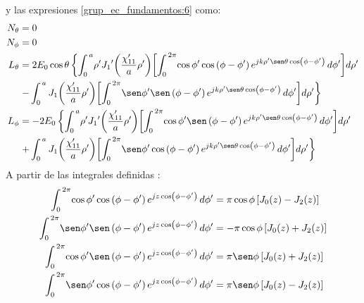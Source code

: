 y las expresiones \eqref{grup_ec_fundamentos:6} como:
\begin{subequations}
\label{grup_ec_apC:8}
\begin{align}
N_{\theta} &= 0
\label{ec_apC:35}\\
N_{\phi} &= 0
\label{ec_apC:36}\\
L_{\theta}  &= 2E_0\cos\theta\left\{\int_{0}^{\,a}\!\rho '{J_1}'\!\left(\frac{\chi '_{11}}{a}\rho '\right)\!\left[\int_{0}^{\,2\pi}\!\cos\phi '\cos\left(\phi - \phi '\right)e^{jk\rho '\sen\theta\cos\left(\phi - \phi '\right)}\,d\phi '\right]\!d\rho '\right.\notag\\
&\left.-\int_{0}^{\,a}J_1\!\left(\frac{\chi '_{11}}{a}\rho '\right)\!\left[\int_{0}^{\,2\pi}\!\sen\phi '\sen\left(\phi - \phi '\right)e^{jk\rho '\sen\theta\cos\left(\phi - \phi '\right)}\,d\phi '\right]\!d\rho '\right\}
\label{ec_apC:37}\\
L_{\phi} &= - 2E_0\left\{\int_{0}^{\,a}\!\rho '{J_1}'\!\left(\frac{\chi '_{11}}{a}\rho '\right)\!\left[\int_{0}^{\,2\pi}\!\cos\phi '\sen\left(\phi - \phi '\right)e^{jk\rho '\sen\theta\cos\left(\phi - \phi '\right)}\,d\phi '\right]\!d\rho '\right.\notag\\
&\left.+\int_{0}^{\,a}J_1\!\left(\frac{\chi '_{11}}{a}\rho '\right)\!\left[\int_{0}^{\,2\pi}\!\sen\phi '\cos\left(\phi - \phi '\right)e^{jk\rho '\sen\theta\cos\left(\phi - \phi '\right)}\,d\phi '\right]\!d\rho '\right\}
\label{ec_apC:38}
\end{align}
\end{subequations}
A partir de las integrales definidas \cite{walfram_bessel_first}:
\begin{subequations}
\label{grup_ec_apC:9}
\begin{align}
\int_{0}^{\,2\pi}\!\cos\phi '\cos\left(\phi - \phi '\right)e^{jz\cos\left(\phi - \phi '\right)}\,d\phi ' &= \pi\cos\phi\left[J_0\!\left(z\right) - J_2\!\left(z\right)\right]
\label{ec_apC:39}\\
\int_{0}^{\,2\pi}\!\sen\phi '\sen\left(\phi - \phi '\right)e^{jz\cos\left(\phi - \phi '\right)}\,d\phi ' &= -\pi\cos\phi\left[J_0\!\left(z\right) + J_2\!\left(z\right)\right]
\label{ec_apC:40}\\
\int_{0}^{\,2\pi}\!\cos\phi '\sen\left(\phi - \phi '\right)e^{jz\cos\left(\phi - \phi '\right)}\,d\phi ' &= \pi\sen\phi\left[J_0\!\left(z\right) + J_2\!\left(z\right)\right]
\label{ec_apC:41}\\
\int_{0}^{\,2\pi}\!\sen\phi '\cos\left(\phi - \phi '\right)e^{jz\cos\left(\phi - \phi '\right)}\,d\phi ' &= \pi\sen\phi\left[J_0\!\left(z\right) - J_2\!\left(z\right)\right]
\label{ec_apC:42}
\end{align}
\end{subequations}
